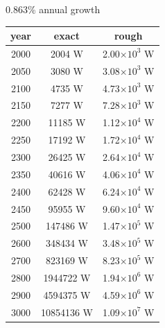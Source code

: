 \documentclass[a4paper]{article}
\begin{document}
	\begin{minipage}{0.5\textwidth}
		
		\begin{center}
			0.863\% annual growth
			
			\medskip
		
			\small
			\begin{tabular}{c | c | c}
				year & exact & rough\\\hline
				2000 & 2004 W & 2.00$\times 10^{3}$ W \\\hline
				2050 & 3080 W & 3.08$\times 10^{3}$ W \\\hline
				2100 & 4735 W & 4.73$\times 10^{3}$ W \\\hline
				2150 & 7277 W & 7.28$\times 10^{3}$ W \\\hline
				2200 & 11185 W & 1.12$\times 10^{4}$ W \\\hline
				2250 & 17192 W & 1.72$\times 10^{4}$ W \\\hline
				2300 & 26425 W & 2.64$\times 10^{4}$ W \\\hline
				2350 & 40616 W & 4.06$\times 10^{4}$ W \\\hline
				2400 & 62428 W & 6.24$\times 10^{4}$ W \\\hline
				2450 & 95955 W & 9.60$\times 10^{4}$ W \\\hline
				2500 & 147486 W & 1.47$\times 10^{5}$ W \\\hline
				2600 & 348434 W & 3.48$\times 10^{5}$ W \\\hline
				2700 & 823169 W & 8.23$\times 10^{5}$ W \\\hline
				2800 & 1944722 W & 1.94$\times 10^{6}$ W \\\hline
				2900 & 4594375 W & 4.59$\times 10^{6}$ W \\\hline
				3000 & 10854136 W & 1.09$\times 10^{7}$ W
				
			\end{tabular}
		\end{center}
	\end{minipage}
	
	\pagebreak
	
	\small
	
\end{document}
